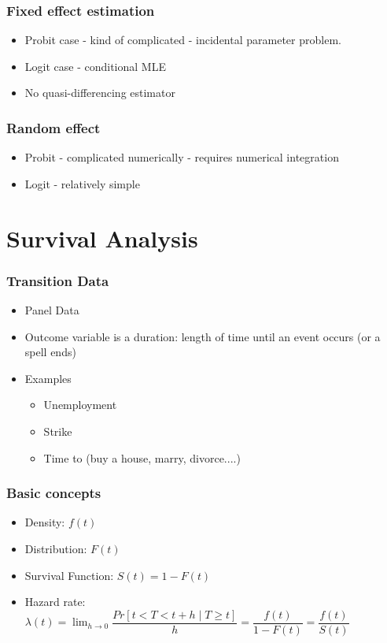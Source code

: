 \documentclass{beamer}
\newcommand{\1}{\mathbb{1}}
\begin{document}
\begin{frame}\frametitle{Fixed effect estimation}
\begin{itemize}
\item Probit case - kind of complicated - incidental parameter problem. 
\item Logit case - conditional MLE
\item No quasi-differencing estimator
\end{itemize}
\end{frame}

\begin{frame}\frametitle{Random effect }
\begin{itemize}
\item Probit - complicated numerically - requires numerical integration
\item Logit - relatively simple
\end{itemize}
\end{frame}



\section{Survival Analysis}

\begin{frame}\frametitle{Transition Data}
\begin{itemize}
 \item Panel Data
 \item Outcome variable is a duration: length of time until an event occurs (or a spell ends)
 \item Examples
 \begin{itemize}
  \item Unemployment
  \item Strike 
  \item Time to (buy a house, marry, divorce....)
 \end{itemize}
\end{itemize}
\end{frame}

\begin{frame}\frametitle{Basic concepts}
\begin{itemize}
\item Density: $f(t)$
\item Distribution: $F(t)$ 
\item Survival Function: $S(t)=1-F(t)$
\item Hazard rate: $\lambda(t) = \lim_{h \rightarrow 0} \dfrac{Pr[t<T<t+h \mid T\geq t]}{h} = \dfrac{f(t)}{1-F(t)} = \dfrac{f(t)}{S(t)}$
\end{itemize}
\end{frame}
\end{document}
